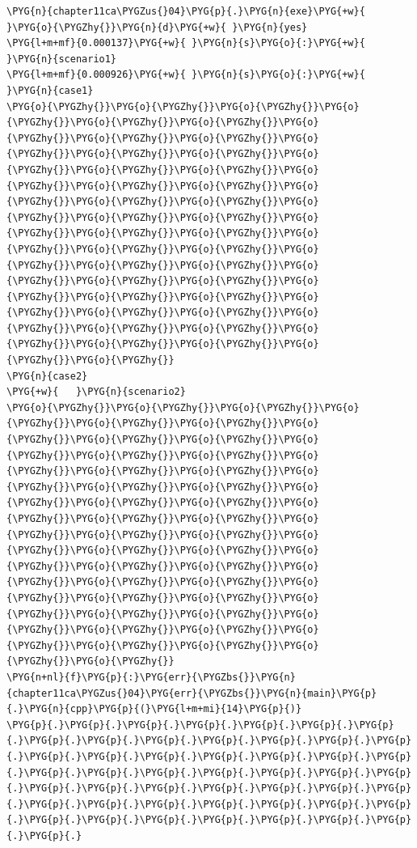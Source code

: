 \begin{itemize}
\begin{codeblockbg}
\begin{Verbatim}[commandchars=\\\{\},breaklines=true,breakanywhere=true,fontsize=\codefont,xleftmargin=17bp]
\PYG{n}{chapter11ca\PYGZus{}04}\PYG{p}{.}\PYG{n}{exe}\PYG{+w}{ }\PYG{o}{\PYGZhy{}}\PYG{n}{d}\PYG{+w}{ }\PYG{n}{yes}
\PYG{l+m+mf}{0.000137}\PYG{+w}{ }\PYG{n}{s}\PYG{o}{:}\PYG{+w}{ }\PYG{n}{scenario1}
\PYG{l+m+mf}{0.000926}\PYG{+w}{ }\PYG{n}{s}\PYG{o}{:}\PYG{+w}{ }\PYG{n}{case1}
\PYG{o}{\PYGZhy{}}\PYG{o}{\PYGZhy{}}\PYG{o}{\PYGZhy{}}\PYG{o}{\PYGZhy{}}\PYG{o}{\PYGZhy{}}\PYG{o}{\PYGZhy{}}\PYG{o}{\PYGZhy{}}\PYG{o}{\PYGZhy{}}\PYG{o}{\PYGZhy{}}\PYG{o}{\PYGZhy{}}\PYG{o}{\PYGZhy{}}\PYG{o}{\PYGZhy{}}\PYG{o}{\PYGZhy{}}\PYG{o}{\PYGZhy{}}\PYG{o}{\PYGZhy{}}\PYG{o}{\PYGZhy{}}\PYG{o}{\PYGZhy{}}\PYG{o}{\PYGZhy{}}\PYG{o}{\PYGZhy{}}\PYG{o}{\PYGZhy{}}\PYG{o}{\PYGZhy{}}\PYG{o}{\PYGZhy{}}\PYG{o}{\PYGZhy{}}\PYG{o}{\PYGZhy{}}\PYG{o}{\PYGZhy{}}\PYG{o}{\PYGZhy{}}\PYG{o}{\PYGZhy{}}\PYG{o}{\PYGZhy{}}\PYG{o}{\PYGZhy{}}\PYG{o}{\PYGZhy{}}\PYG{o}{\PYGZhy{}}\PYG{o}{\PYGZhy{}}\PYG{o}{\PYGZhy{}}\PYG{o}{\PYGZhy{}}\PYG{o}{\PYGZhy{}}\PYG{o}{\PYGZhy{}}\PYG{o}{\PYGZhy{}}\PYG{o}{\PYGZhy{}}\PYG{o}{\PYGZhy{}}\PYG{o}{\PYGZhy{}}\PYG{o}{\PYGZhy{}}\PYG{o}{\PYGZhy{}}\PYG{o}{\PYGZhy{}}\PYG{o}{\PYGZhy{}}\PYG{o}{\PYGZhy{}}\PYG{o}{\PYGZhy{}}\PYG{o}{\PYGZhy{}}\PYG{o}{\PYGZhy{}}\PYG{o}{\PYGZhy{}}\PYG{o}{\PYGZhy{}}
\PYG{n}{case2}
\PYG{+w}{   }\PYG{n}{scenario2}
\PYG{o}{\PYGZhy{}}\PYG{o}{\PYGZhy{}}\PYG{o}{\PYGZhy{}}\PYG{o}{\PYGZhy{}}\PYG{o}{\PYGZhy{}}\PYG{o}{\PYGZhy{}}\PYG{o}{\PYGZhy{}}\PYG{o}{\PYGZhy{}}\PYG{o}{\PYGZhy{}}\PYG{o}{\PYGZhy{}}\PYG{o}{\PYGZhy{}}\PYG{o}{\PYGZhy{}}\PYG{o}{\PYGZhy{}}\PYG{o}{\PYGZhy{}}\PYG{o}{\PYGZhy{}}\PYG{o}{\PYGZhy{}}\PYG{o}{\PYGZhy{}}\PYG{o}{\PYGZhy{}}\PYG{o}{\PYGZhy{}}\PYG{o}{\PYGZhy{}}\PYG{o}{\PYGZhy{}}\PYG{o}{\PYGZhy{}}\PYG{o}{\PYGZhy{}}\PYG{o}{\PYGZhy{}}\PYG{o}{\PYGZhy{}}\PYG{o}{\PYGZhy{}}\PYG{o}{\PYGZhy{}}\PYG{o}{\PYGZhy{}}\PYG{o}{\PYGZhy{}}\PYG{o}{\PYGZhy{}}\PYG{o}{\PYGZhy{}}\PYG{o}{\PYGZhy{}}\PYG{o}{\PYGZhy{}}\PYG{o}{\PYGZhy{}}\PYG{o}{\PYGZhy{}}\PYG{o}{\PYGZhy{}}\PYG{o}{\PYGZhy{}}\PYG{o}{\PYGZhy{}}\PYG{o}{\PYGZhy{}}\PYG{o}{\PYGZhy{}}\PYG{o}{\PYGZhy{}}\PYG{o}{\PYGZhy{}}\PYG{o}{\PYGZhy{}}\PYG{o}{\PYGZhy{}}\PYG{o}{\PYGZhy{}}\PYG{o}{\PYGZhy{}}\PYG{o}{\PYGZhy{}}\PYG{o}{\PYGZhy{}}\PYG{o}{\PYGZhy{}}\PYG{o}{\PYGZhy{}}
\PYG{n+nl}{f}\PYG{p}{:}\PYG{err}{\PYGZbs{}}\PYG{n}{chapter11ca\PYGZus{}04}\PYG{err}{\PYGZbs{}}\PYG{n}{main}\PYG{p}{.}\PYG{n}{cpp}\PYG{p}{(}\PYG{l+m+mi}{14}\PYG{p}{)}
\PYG{p}{.}\PYG{p}{.}\PYG{p}{.}\PYG{p}{.}\PYG{p}{.}\PYG{p}{.}\PYG{p}{.}\PYG{p}{.}\PYG{p}{.}\PYG{p}{.}\PYG{p}{.}\PYG{p}{.}\PYG{p}{.}\PYG{p}{.}\PYG{p}{.}\PYG{p}{.}\PYG{p}{.}\PYG{p}{.}\PYG{p}{.}\PYG{p}{.}\PYG{p}{.}\PYG{p}{.}\PYG{p}{.}\PYG{p}{.}\PYG{p}{.}\PYG{p}{.}\PYG{p}{.}\PYG{p}{.}\PYG{p}{.}\PYG{p}{.}\PYG{p}{.}\PYG{p}{.}\PYG{p}{.}\PYG{p}{.}\PYG{p}{.}\PYG{p}{.}\PYG{p}{.}\PYG{p}{.}\PYG{p}{.}\PYG{p}{.}\PYG{p}{.}\PYG{p}{.}\PYG{p}{.}\PYG{p}{.}\PYG{p}{.}\PYG{p}{.}\PYG{p}{.}\PYG{p}{.}\PYG{p}{.}\PYG{p}{.}

\end{Verbatim}
\end{codeblockbg}
\end{itemize}
